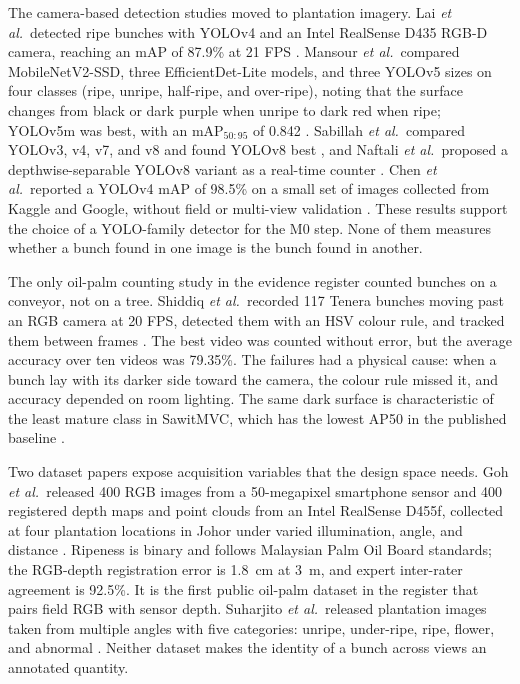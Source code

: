 The camera-based detection studies moved to plantation imagery. Lai \textit{et al.}\ detected ripe bunches with YOLOv4 and an Intel RealSense D435 RGB-D camera, reaching an mAP of 87.9\% at 21 FPS \cite{lai2022yolov4palm}. Mansour \textit{et al.}\ compared MobileNetV2-SSD, three EfficientDet-Lite models, and three YOLOv5 sizes on four classes (ripe, unripe, half-ripe, and over-ripe), noting that the surface changes from black or dark purple when unripe to dark red when ripe; YOLOv5m was best, with an mAP$_{50{:}95}$ of 0.842 \cite{ledger_r_19d96439ecdda18d}. Sabillah \textit{et al.}\ compared YOLOv3, v4, v7, and v8 and found YOLOv8 best \cite{ledger_r_134385f2faed38a6}, and Naftali \textit{et al.}\ proposed a depthwise-separable YOLOv8 variant as a real-time counter \cite{naftali2024palmcounter}. Chen \textit{et al.}\ reported a YOLOv4 mAP of 98.5\% on a small set of images collected from Kaggle and Google, without field or multi-view validation \cite{chen2022ffbdet}. These results support the choice of a YOLO-family detector for the M0 step. None of them measures whether a bunch found in one image is the bunch found in another.

The only oil-palm counting study in the evidence register counted bunches on a conveyor, not on a tree. Shiddiq \textit{et al.}\ recorded 117 Tenera bunches moving past an RGB camera at 20 FPS, detected them with an HSV colour rule, and tracked them between frames \cite{shiddiq2023palmcount}. The best video was counted without error, but the average accuracy over ten videos was 79.35\%. The failures had a physical cause: when a bunch lay with its darker side toward the camera, the colour rule missed it, and accuracy depended on room lighting. The same dark surface is characteristic of the least mature class in SawitMVC, which has the lowest AP50 in the published baseline \cite{indriani2026sawitmvc}.

Two dataset papers expose acquisition variables that the design space needs. Goh \textit{et al.}\ released 400 RGB images from a 50-megapixel smartphone sensor and 400 registered depth maps and point clouds from an Intel RealSense D455f, collected at four plantation locations in Johor under varied illumination, angle, and distance \cite{goh2025palmdataset}. Ripeness is binary and follows Malaysian Palm Oil Board standards; the RGB-depth registration error is 1.8~cm at 3~m, and expert inter-rater agreement is 92.5\%. It is the first public oil-palm dataset in the register that pairs field RGB with sensor depth. Suharjito \textit{et al.}\ released plantation images taken from multiple angles with five categories: unripe, under-ripe, ripe, flower, and abnormal \cite{suharjito2025palmdataset}. Neither dataset makes the identity of a bunch across views an annotated quantity.


